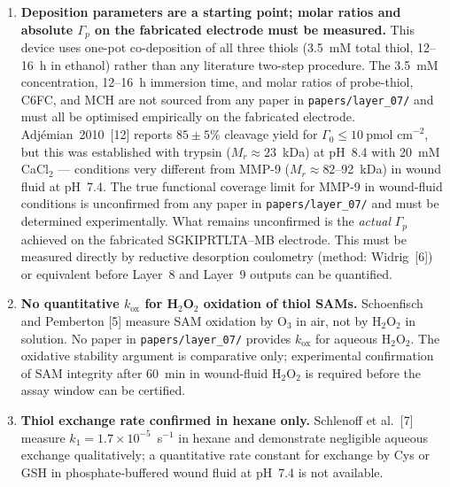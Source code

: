 \documentclass[10pt,a4paper]{article}
\numberwithin{equation}{section}
\newcommand{\cit}[1]{[#1]}   %
\begin{document}
\begin{enumerate}[noitemsep]

  \item \textbf{Deposition parameters are a starting point; molar ratios and absolute
    $\Gamma_p$ on the fabricated electrode must be measured.}
    This device uses one-pot co-deposition of all three thiols (3.5~mM total thiol,
    12--16~h in ethanol) rather than any literature two-step procedure. The 3.5~mM
    concentration, 12--16~h immersion time, and molar ratios of probe-thiol, C6FC, and
    MCH are not sourced from any paper in \texttt{papers/layer\_07/} and must all be
    optimised empirically on the fabricated electrode.
    Adj\'{e}mian~2010~\cit{12} reports $85 \pm 5$\% cleavage yield for $\Gamma_0 \leq
    10\ \text{pmol~cm}^{-2}$, but this was established with trypsin ($M_r \approx 23$~kDa)
    at pH~8.4 with 20~mM CaCl$_2$ --- conditions very different from MMP-9
    ($M_r \approx 82$--92~kDa) in wound fluid at pH~7.4. The true functional coverage
    limit for MMP-9 in wound-fluid conditions is unconfirmed from any paper in
    \texttt{papers/layer\_07/} and must be determined experimentally. What remains
    unconfirmed is the \emph{actual} $\Gamma_p$ achieved on the fabricated
    SGKIPRTLTA--MB electrode. This must be measured directly by reductive desorption
    coulometry (method: Widrig~\cit{6}) or equivalent before Layer~8 and Layer~9 outputs
    can be quantified.

  \item \textbf{No quantitative $k_{\mathrm{ox}}$ for H$_2$O$_2$ oxidation of thiol SAMs.}
    Schoenfisch and Pemberton \cit{5} measure SAM oxidation by O$_3$ in air, not by
    H$_2$O$_2$ in solution. No paper in \texttt{papers/layer\_07/} provides $k_{\mathrm{ox}}$
    for aqueous H$_2$O$_2$. The oxidative stability argument is comparative only;
    experimental confirmation of SAM integrity after 60~min in wound-fluid H$_2$O$_2$ is
    required before the assay window can be certified.

  \item \textbf{Thiol exchange rate confirmed in hexane only.}
    Schlenoff et al.\ \cit{7} measure $k_1 = 1.7 \times 10^{-5}$~s$^{-1}$ in hexane
    and demonstrate negligible aqueous exchange qualitatively; a quantitative rate constant
    for exchange by Cys or GSH in phosphate-buffered wound fluid at pH~7.4 is not available.


\end{enumerate}
\end{document}
